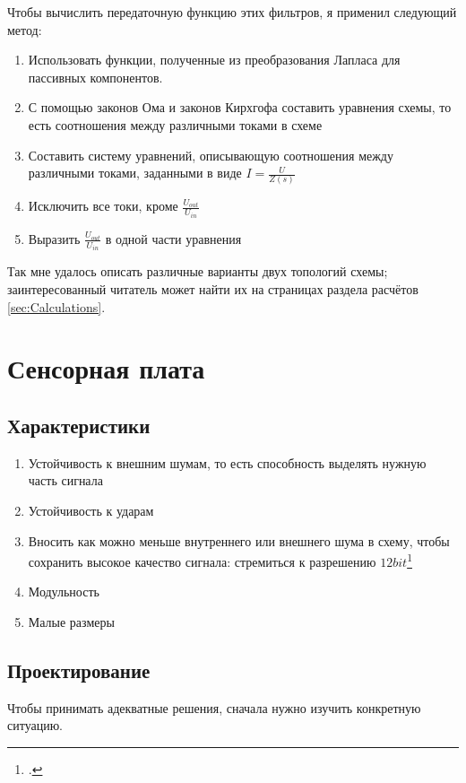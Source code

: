 \documentclass[a4paper, 10pt, final]{article} %
\begin{document}
    \noindent Чтобы вычислить передаточную функцию этих фильтров, я применил следующий метод:
    \begin{enumerate}[label=\emph{(\roman*)}]
        \item Использовать функции, полученные из преобразования Лапласа для пассивных компонентов.
        \item С помощью законов Ома и законов Кирхгофа составить уравнения схемы, то есть соотношения между различными токами в схеме
        \item Составить систему уравнений, описывающую соотношения между различными токами, заданными в виде $I=\frac{U}{Z(s)}$
        \item Исключить все токи, кроме $\frac{U_{out}}{U_{in}}$
        \item Выразить $\frac{U_{out}}{U_{in}}$ в одной части уравнения
    \end{enumerate}
    Так мне удалось описать различные варианты двух топологий схемы; заинтересованный читатель может найти их на страницах раздела расчётов \ref{sec:Calculations}.

    \clearpage
    \section{Сенсорная плата}\label{sec:Sensorboard}
    \subsection{Характеристики}\label{sec:SensorboardCharacteristics}
    \begin{enumerate}[label=\emph{(\arabic*)}]
        \item Устойчивость к внешним шумам, то есть способность выделять нужную часть сигнала
        \item Устойчивость к ударам
        \item Вносить как можно меньше внутреннего или внешнего шума в схему, чтобы сохранить высокое качество сигнала: стремиться к разрешению $12bit$\footcite[p9]{EMGBitdepth}
        \item Модульность
        \item Малые размеры
    \end{enumerate}

    \subsection{Проектирование}\label{sec:SensorboardDesign}
    Чтобы принимать адекватные решения, сначала нужно изучить конкретную ситуацию.
\end{document}
